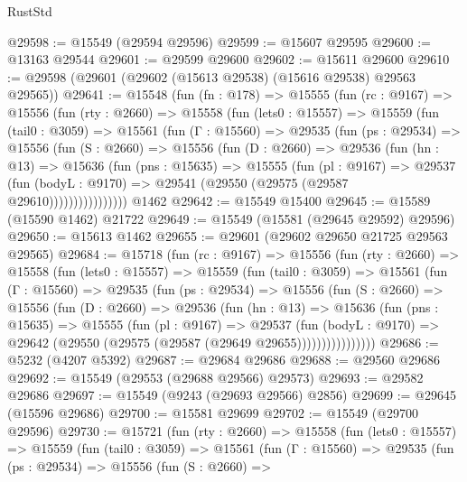 \begin{lexlean}{RustStd}
\begin{coremodule}
@29598 := @15549 (@29594 @29596)
@29599 := @15607 @29595
@29600 := @13163 @29544
@29601 := @29599 @29600
@29602 := @15611 @29600
@29610 := @29598 (@29601 (@29602 (@15613 @29538) (@15616 @29538) @29563 @29565))
@29641 := @15548
    (fun (fn : @178) =>
    @15555
      (fun (rc : @9167) =>
      @15556
        (fun (rty : @2660) =>
        @15558
          (fun (lets0 : @15557) =>
          @15559
            (fun (tail0 : @3059) =>
            @15561
              (fun (Γ : @15560) =>
              @29535
                (fun (ps : @29534) =>
                @15556
                  (fun (S : @2660) =>
                  @15556
                    (fun (D : @2660) =>
                    @29536
                      (fun (hn : @13) =>
                      @15636
                        (fun (pns : @15635) =>
                        @15555
                          (fun (pl : @9167) =>
                          @29537
                            (fun (bodyL : @9170) =>
                            @29541 (@29550 (@29575 (@29587 @29610))))))))))))))))
    @1462
@29642 := @15549 @15400
@29645 := @15589 (@15590 @1462) @21722
@29649 := @15549 (@15581 (@29645 @29592) @29596)
@29650 := @15613 @1462
@29655 := @29601 (@29602 @29650 @21725 @29563 @29565)
@29684 := @15718
    (fun (rc : @9167) =>
    @15556
      (fun (rty : @2660) =>
      @15558
        (fun (lets0 : @15557) =>
        @15559
          (fun (tail0 : @3059) =>
          @15561
            (fun (Γ : @15560) =>
            @29535
              (fun (ps : @29534) =>
              @15556
                (fun (S : @2660) =>
                @15556
                  (fun (D : @2660) =>
                  @29536
                    (fun (hn : @13) =>
                    @15636
                      (fun (pns : @15635) =>
                      @15555
                        (fun (pl : @9167) =>
                        @29537
                          (fun (bodyL : @9170) =>
                          @29642 (@29550 (@29575 (@29587 (@29649 @29655))))))))))))))))
@29686 := @5232 (@4207 @5392)
@29687 := @29684 @29686
@29688 := @29560 @29686
@29692 := @15549 (@29553 (@29688 @29566) @29573)
@29693 := @29582 @29686
@29697 := @15549 (@9243 (@29693 @29566) @2856)
@29699 := @29645 (@15596 @29686)
@29700 := @15581 @29699
@29702 := @15549 (@29700 @29596)
@29730 := @15721
    (fun (rty : @2660) =>
    @15558
      (fun (lets0 : @15557) =>
      @15559
        (fun (tail0 : @3059) =>
        @15561
          (fun (Γ : @15560) =>
          @29535
            (fun (ps : @29534) =>
            @15556
              (fun (S : @2660) =>

\end{coremodule}
\end{lexlean}
